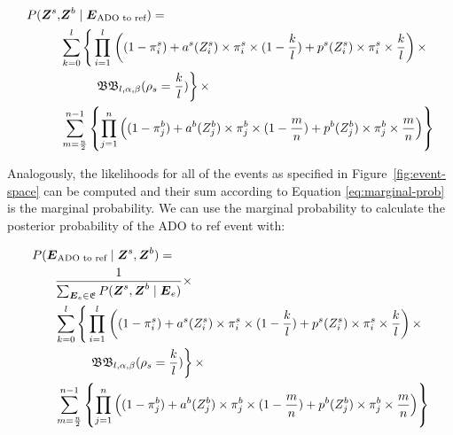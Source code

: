 \documentclass[authoryear,preprint,11pt]{scrartcl}
\newcommand{\Prob}{{P}}
\newcommand{\cB}{{\mathfrak B}}
\begin{document}
\begin{equation}
  \begin{split}
  \label{eq:ado-to-ref-likelihood-data}
    \Prob(\boldsymbol{Z}^s,&\boldsymbol{Z}^b \mid \boldsymbol{E}_{\text{ADO to ref}}) =\\
    &\sum_{k=0}^{l} \left\{\vphantom{\prod_{i}{l}} \prod_{i=1}^{l} \right.\left( (1 - \pi_i^s) + a^s(Z_i^s)\times \pi_i^s \times (1 - \frac{k}{l}) + p^s(Z_i^s) \times \pi_i^s \times \frac{k}{l} \right) \times \\
    &\qquad~~\left.\cB\cB_{l,\alpha, \beta} (\rho_s = \frac{k}{l}) \right\} \times\\
    &\sum_{m=\frac{n}{2}}^{n-1} \left\{ \prod_{j=1}^{n} \left( (1 - \pi_j^b) + a^b(Z_j^b)\times \pi_j^b \times (1 - \frac{m}{n}) + p^b(Z_j^b) \times \pi_j^b \times \frac{m}{n} \right) \right\}\\
  \end{split}
\end{equation}

Analogously, the likelihoods for all of the events as specified in Figure~\ref{fig:event-space} can be computed and their sum according to Equation \ref{eq:marginal-prob} is the marginal probability.
We can use the marginal probability to calculate the posterior probability of the {\ttfamily ADO to ref} event with:

\begin{equation}
  \begin{split}
  \label{eq:ado-to-ref-posterior-prob}
    \Prob(&\boldsymbol{E}_{\text{ADO to ref}} \mid \boldsymbol{Z}^s,\boldsymbol{Z}^b) =\\
    &~~\frac{1}{\sum_{\boldsymbol{E}_e \in \mathfrak{E}}{\Prob(\boldsymbol{Z}^s,\boldsymbol{Z}^b \mid \boldsymbol{E}_e )}} \times\\
    &~~\sum_{k=0}^{l} \left\{\vphantom{\prod_{i}{l}} \prod_{i=1}^{l} \right.\left( (1 - \pi_i^s) + a^s(Z_i^s)\times \pi_i^s \times (1 - \frac{k}{l}) + p^s(Z_i^s) \times \pi_i^s \times \frac{k}{l} \right) \times \\
    &~~\qquad~~\left.\cB\cB_{l,\alpha, \beta} (\rho_s = \frac{k}{l}) \right\} \times\\
    &~~\sum_{m=\frac{n}{2}}^{n-1} \left\{ \prod_{j=1}^{n} \left( (1 - \pi_j^b) + a^b(Z_j^b)\times \pi_j^b \times (1 - \frac{m}{n}) + p^b(Z_j^b) \times \pi_j^b \times \frac{m}{n} \right) \right\}\\
  \end{split}
\end{equation}
\end{document}
